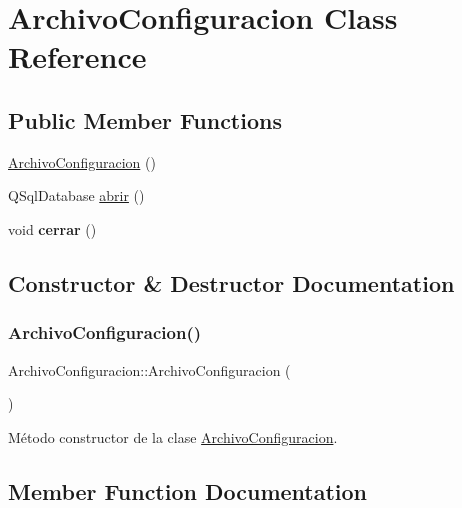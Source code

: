 \hypertarget{classArchivoConfiguracion}{}\section{Archivo\+Configuracion Class Reference}
\label{classArchivoConfiguracion}
\subsection*{Public Member Functions}
\begin{DoxyCompactItemize}
\item 
\mbox{\hyperlink{classArchivoConfiguracion_ad3fa1f33caae8abc3ed42b654d0bf638}{Archivo\+Configuracion}} ()
\item 
Q\+Sql\+Database \mbox{\hyperlink{classArchivoConfiguracion_ad3fb1299938a73be444e51deee868187}{abrir}} ()
\item 
\mbox{\label{classArchivoConfiguracion_a05a6a7e6aa22db5a1c54cf98ae67e912}} 
void {\bfseries cerrar} ()
\end{DoxyCompactItemize}


\subsection{Constructor \& Destructor Documentation}
\mbox{\label{classArchivoConfiguracion_ad3fa1f33caae8abc3ed42b654d0bf638}} 
\subsubsection{\texorpdfstring{Archivo\+Configuracion()}{ArchivoConfiguracion()}}
{\footnotesize\ttfamily Archivo\+Configuracion\+::\+Archivo\+Configuracion (\begin{DoxyParamCaption}{ }\end{DoxyParamCaption})}

Método constructor de la clase \mbox{\hyperlink{classArchivoConfiguracion}{Archivo\+Configuracion}}. 

\subsection{Member Function Documentation}
\mbox{\label{classArchivoConfiguracion_ad3fb1299938a73be444e51deee868187}} 
